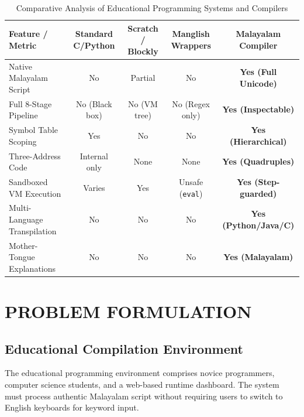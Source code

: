 \documentclass[12pt,a4paper]{report}
\begin{document}
\begin{table}[htbp]
    \centering
    \caption{Comparative Analysis of Educational Programming Systems and Compilers}
    \label{tab:comparative_study}
    \vspace{0.2cm}
    \begin{tabularx}{\textwidth}{lcccc}
        \toprule
        \textbf{Feature / Metric} & \textbf{Standard C/Python} & \textbf{Scratch / Blockly} & \textbf{Manglish Wrappers} & \textbf{Malayalam Compiler} \\
        \midrule
        Native Malayalam Script & No & Partial & No & \textbf{Yes (Full Unicode)} \\
        Full 8-Stage Pipeline & No (Black box) & No (VM tree) & No (Regex only) & \textbf{Yes (Inspectable)} \\
        Symbol Table Scoping & Yes & No & No & \textbf{Yes (Hierarchical)} \\
        Three-Address Code & Internal only & None & None & \textbf{Yes (Quadruples)} \\
        Sandboxed VM Execution & Varies & Yes & Unsafe (\texttt{eval}) & \textbf{Yes (Step-guarded)} \\
        Multi-Language Transpilation & No & No & No & \textbf{Yes (Python/Java/C)} \\
        Mother-Tongue Explanations & No & No & No & \textbf{Yes (Malayalam)} \\
        \bottomrule
    \end{tabularx}
\end{table}

\newpage
\chapter{PROBLEM FORMULATION}

\section{Educational Compilation Environment}
The educational programming environment comprises novice programmers, computer science students, and a web-based runtime dashboard. The system must process authentic Malayalam script without requiring users to switch to English keyboards for keyword input.
\end{document}
